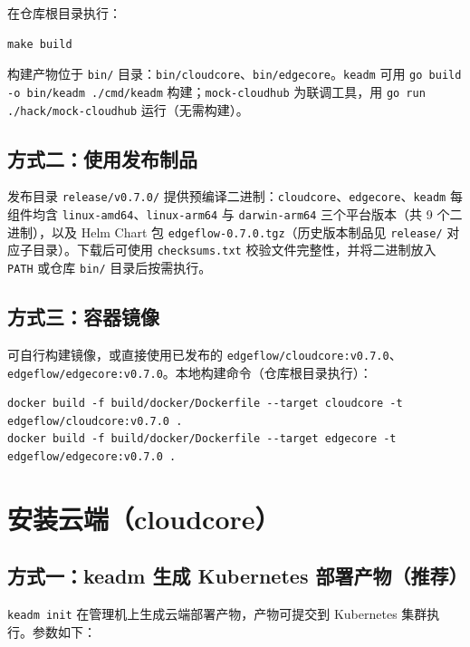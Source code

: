 在仓库根目录执行：

\begin{lstlisting}
make build
\end{lstlisting}

构建产物位于 \texttt{bin/} 目录：\texttt{bin/cloudcore}、\texttt{bin/edgecore}。\texttt{keadm} 可用 \texttt{go build -o bin/keadm ./cmd/keadm} 构建；\texttt{mock-cloudhub} 为联调工具，用 \texttt{go run ./hack/mock-cloudhub} 运行（无需构建）。

\subsection{方式二：使用发布制品}

发布目录 \texttt{release/v0.7.0/} 提供预编译二进制：\texttt{cloudcore}、\texttt{edgecore}、\texttt{keadm} 每组件均含 \texttt{linux-amd64}、\texttt{linux-arm64} 与 \texttt{darwin-arm64} 三个平台版本（共 9 个二进制），以及 Helm Chart 包 \texttt{edgeflow-0.7.0.tgz}（历史版本制品见 \texttt{release/} 对应子目录）。下载后可使用 \texttt{checksums.txt} 校验文件完整性，并将二进制放入 \texttt{PATH} 或仓库 \texttt{bin/} 目录后按需执行。

\subsection{方式三：容器镜像}

可自行构建镜像，或直接使用已发布的 \texttt{edgeflow/cloudcore:v0.7.0}、\texttt{edgeflow/edgecore:v0.7.0}。本地构建命令（仓库根目录执行）：

\begin{lstlisting}
docker build -f build/docker/Dockerfile --target cloudcore -t edgeflow/cloudcore:v0.7.0 .
docker build -f build/docker/Dockerfile --target edgecore -t edgeflow/edgecore:v0.7.0 .
\end{lstlisting}

\section{安装云端（cloudcore）}

\subsection{方式一：keadm 生成 Kubernetes 部署产物（推荐）}

\texttt{keadm init} 在管理机上生成云端部署产物，产物可提交到 Kubernetes 集群执行。参数如下：

